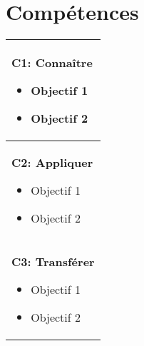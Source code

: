 \section*{Compétences}
 { \small
  \begin{spacing}{1.2}
	  \begin{tabularx}{\textwidth}{|X|}
		  \hline
		  \textbf{C1: Connaître}
		  \begin{itemize}
			  \item Objectif 1
			  \item Objectif 2
		  \end{itemize} \\
		  \hline
		  \textbf{C2: Appliquer}
		  \begin{itemize}
			  \item Objectif 1
			  \item Objectif 2
		  \end{itemize} \\
		  \hline
		  \textbf{C3: Transférer}
		  \begin{itemize}
			  \item Objectif 1
			  \item Objectif 2
		  \end{itemize} \\
		  \hline
	  \end{tabularx}
  \end{spacing}
 }

